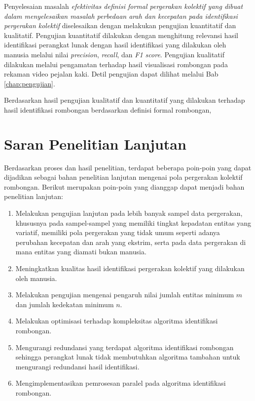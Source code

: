 Penyelesaian masalah \textit{efektivitas definisi formal pergerakan kolektif yang dibuat dalam menyelesaikan masalah perbedaan arah dan kecepatan pada identifikasi pergerakan kolektif} diselesaikan dengan melakukan pengujian kuantitatif dan kualitatif. Pengujian kuantitatif dilakukan dengan menghitung relevansi hasil identifikasi perangkat lunak dengan hasil identifikasi yang dilakukan oleh manusia melalui nilai \textit{precision}, \textit{recall}, dan \textit{F1 score}. Pengujian kualitatif dilakukan melalui pengamatan terhadap hasil visualisasi rombongan pada rekaman video pejalan kaki. Detil pengujian dapat dilihat melalui Bab \ref{chap:pengujian}.

Berdasarkan hasil pengujian kualitatif dan kuantitatif yang dilakukan terhadap hasil identifikasi rombongan berdasarkan definisi formal rombongan,

\section{Saran Penelitian Lanjutan}
\label{sec:saran}

Berdasarkan proses dan hasil penelitian, terdapat beberapa poin-poin yang dapat dijadikan sebagai bahan penelitian lanjutan mengenai pola pergerakan kolektif rombongan. Berikut merupakan poin-poin yang dianggap dapat menjadi bahan penelitian lanjutan:

\begin{enumerate}
    \item Melakukan pengujian lanjutan pada lebih banyak sampel data pergerakan, khususnya pada sampel-sampel yang memiliki tingkat kepadatan entitas yang variatif, memiliki pola pergerakan yang tidak umum seperti adanya perubahan kecepatan dan arah yang ekstrim, serta pada data pergerakan di mana entitas yang diamati bukan manusia.
    \item Meningkatkan kualitas hasil identifikasi pergerakan kolektif yang dilakukan oleh manusia.
    \item Melakukan pengujian mengenai pengaruh nilai jumlah entitas minimum $m$ dan jumlah kedekatan minimum $n$.
    \item Melakukan optimisasi terhadap kompleksitas algoritma identifikasi rombongan.
    \item Mengurangi redundansi yang terdapat algoritma identifikasi rombongan sehingga perangkat lunak tidak membutuhkan algoritma tambahan untuk mengurangi redundansi hasil identifikasi.
    \item Mengimplementasikan pemrosesan paralel pada algoritma identifikasi rombongan.
\end{enumerate}